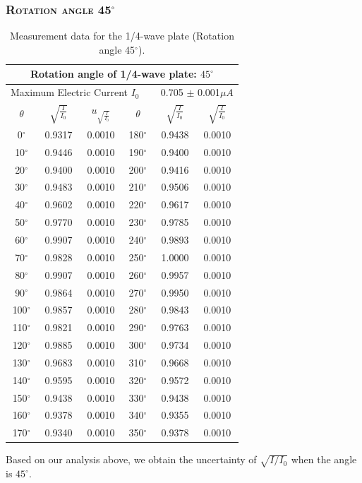 \documentclass[a4paper,12pt]{article}
\begin{document}
\begin{appendices}
\newpage
\subsubsection{\textsc{Rotation angle 45$^\circ$}}
\begin{table}[h]
\begin{center}
\begin{tabular}{|c|c|c||c|c|c|}
\hline
\multicolumn{6}{|c|}{Rotation angle of 1/4-wave plate: $45^{\circ}$}\\
\hline 
\multicolumn{6}{|c|}{Maximum Electric Current $I_0$ ~~~ 0.705 $\pm$ 0.001$\mu A$}\\
\hline 
$\theta$ & $\sqrt{\frac{I}{I_0}}$ & $u_{\sqrt{\frac{I}{I_0}}}$ & $\theta$ & $\sqrt{\frac{I}{I_0}}$ & $\sqrt{\frac{I}{I_0}}$ \\
\hline
0$^{\circ}$ & 0.9317 & 0.0010 & 180$^{\circ}$ & 0.9438 & 0.0010 \\
\hline 
10$^{\circ}$ & 0.9446 & 0.0010 & 190$^{\circ}$ & 0.9400 & 0.0010\\
\hline
20$^{\circ}$ & 0.9400 & 0.0010 & 200$^{\circ}$ & 0.9416 & 0.0010\\
\hline
30$^{\circ}$ & 0.9483 & 0.0010 & 210$^{\circ}$ & 0.9506 & 0.0010\\
\hline
40$^{\circ}$ & 0.9602 & 0.0010 & 220$^{\circ}$ & 0.9617 & 0.0010\\
\hline
50$^{\circ}$ & 0.9770 & 0.0010 & 230$^{\circ}$ & 0.9785 & 0.0010\\
\hline
60$^{\circ}$ & 0.9907 & 0.0010 & 240$^{\circ}$ & 0.9893 & 0.0010\\
\hline
70$^{\circ}$ & 0.9828 & 0.0010 & 250$^{\circ}$ & 1.0000 & 0.0010\\
\hline
80$^{\circ}$ & 0.9907 & 0.0010 & 260$^{\circ}$ & 0.9957 & 0.0010\\
\hline
90$^{\circ}$ & 0.9864 & 0.0010 & 270$^{\circ}$ & 0.9950 & 0.0010\\
\hline
100$^{\circ}$ & 0.9857 & 0.0010 & 280$^{\circ}$ & 0.9843 & 0.0010\\
\hline
110$^{\circ}$ & 0.9821 & 0.0010 & 290$^{\circ}$ & 0.9763 & 0.0010\\
\hline
120$^{\circ}$ & 0.9885 & 0.0010 & 300$^{\circ}$ & 0.9734 & 0.0010\\
\hline
130$^{\circ}$ & 0.9683 & 0.0010 & 310$^{\circ}$ & 0.9668 & 0.0010\\
\hline
140$^{\circ}$ & 0.9595 & 0.0010 & 320$^{\circ}$ & 0.9572 & 0.0010\\
\hline
150$^{\circ}$ & 0.9438 & 0.0010 & 330$^{\circ}$ & 0.9438 & 0.0010\\
\hline
160$^{\circ}$ & 0.9378 & 0.0010 & 340$^{\circ}$ & 0.9355 & 0.0010\\
\hline
170$^{\circ}$ & 0.9340 & 0.0010 & 350$^{\circ}$ & 0.9378 & 0.0010\\
\hline
\end{tabular}
\caption{Measurement data for the 1/4-wave plate (Rotation angle 45$^{\circ}$).}
\end{center}
\end{table}
Based on our analysis above, we obtain the uncertainty of $\sqrt{I/I_0}$ when the angle is $45^{\circ}$.


\end{appendices}
\end{document}
